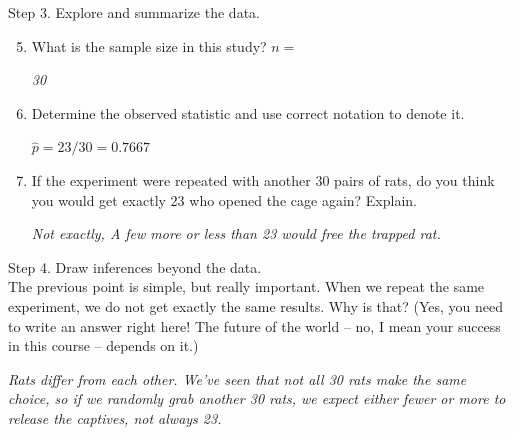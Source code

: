 {\sf Step 3. Explore and summarize the data.}\vspace{-.1in}
\begin{enumerate}
  \setcounter{enumi}{4}
  \item What is the sample size in this study?  $n = $
\begin{students}
  \vspace{1cm}
\end{students}
\begin{key}
{\it  30}
\end{key}

  \item \label{p.hat} Determine the observed statistic and use correct
    notation to  denote it.
\begin{students}
  \vspace{1cm}
\end{students}

\begin{key}
{\it  $\widehat{p} = 23/30 = 0.7667$}
\end{key}

  \item If the experiment were repeated with another 30 pairs of rats,
    do you think you would get exactly 23 who opened the cage again?
    Explain. 
\begin{students}
  \vspace{2.5cm}
\end{students}

\begin{key}
{\it  Not exactly, A few more or less than 23 would free the trapped
  rat. }
\end{key}
\end{enumerate}



{\sf Step 4. Draw inferences beyond the data. }\\

  The previous point is simple, but really important. When we repeat the
  same experiment, we do not get exactly the same results.   Why is
  that?  (Yes, you need to write an answer right here!  The future of
  the world -- no, I mean your success in this course -- depends on it.) 
\begin{students}
  \vspace{2.5cm}
\end{students}

\begin{key}
{\it  Rats differ from each other. We've seen that not all 30 rats
  make the same choice, so if we randomly grab another 30 rats, we
  expect either fewer or more to release the captives, not always 23. }
\end{key}


